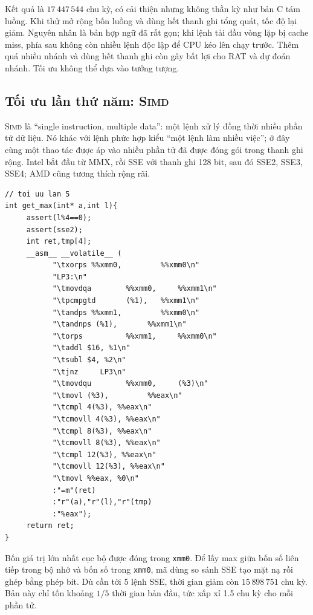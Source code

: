 \documentclass[11pt]{article}
\newcommand{\SIMD}{\textsc{Simd}}
\begin{document}
Kết quả là \(17\,447\,544\) chu kỳ, có cải thiện nhưng không thần kỳ như bản
C tám luồng. Khi thử mở rộng bốn luồng và dùng hết thanh ghi tổng quát, tốc độ
lại giảm. Nguyên nhân là bản hợp ngữ đã rất gọn; khi lệnh tải đầu vòng lặp bị
cache miss, phía sau không còn nhiều lệnh độc lập để CPU kéo lên chạy trước.
Thêm quá nhiều nhánh và dùng hết thanh ghi còn gây bất lợi cho RAT và dự đoán
nhánh. Tối ưu không thể dựa vào tưởng tượng.

\subsection{Tối ưu lần thứ năm: \SIMD}

\SIMD{} là ``single instruction, multiple data'': một lệnh xử lý đồng thời
nhiều phần tử dữ liệu. Nó khác với lệnh phức hợp kiểu ``một lệnh làm nhiều
việc''; ở đây cùng một thao tác được áp vào nhiều phần tử đã được đóng gói
trong thanh ghi rộng. Intel bắt đầu từ MMX, rồi SSE với thanh ghi 128 bit, sau
đó SSE2, SSE3, SSE4; AMD cũng tương thích rộng rãi.

\begin{verbatim}
// toi uu lan 5
int get_max(int* a,int l){
     assert(l%4==0);
     assert(sse2);
     int ret,tmp[4];
     __asm__ __volatile__ (
           "\txorps %%xmm0,         %%xmm0\n"
           "LP3:\n"
           "\tmovdqa        %%xmm0,     %%xmm1\n"
           "\tpcmpgtd       (%1),   %%xmm1\n"
           "\tandps %%xmm1,         %%xmm0\n"
           "\tandnps (%1),       %%xmm1\n"
           "\torps          %%xmm1,     %%xmm0\n"
           "\taddl $16, %1\n"
           "\tsubl $4, %2\n"
           "\tjnz     LP3\n"
           "\tmovdqu        %%xmm0,     (%3)\n"
           "\tmovl (%3),         %%eax\n"
           "\tcmpl 4(%3), %%eax\n"
           "\tcmovll 4(%3), %%eax\n"
           "\tcmpl 8(%3), %%eax\n"
           "\tcmovll 8(%3), %%eax\n"
           "\tcmpl 12(%3), %%eax\n"
           "\tcmovll 12(%3), %%eax\n"
           "\tmovl %%eax, %0\n"
           :"=m"(ret)
           :"r"(a),"r"(l),"r"(tmp)
           :"%eax");
     return ret;
}
\end{verbatim}

Bốn giá trị lớn nhất cục bộ được đóng trong \texttt{xmm0}. Để lấy max giữa
bốn số liên tiếp trong bộ nhớ và bốn số trong \texttt{xmm0}, mã dùng so sánh
SSE tạo mặt nạ rồi ghép bằng phép bit. Dù cần tới 5 lệnh SSE, thời gian giảm
còn \(15\,898\,751\) chu kỳ. Bản này chỉ tốn khoảng \(1/5\) thời gian bản đầu,
tức xấp xỉ 1.5 chu kỳ cho mỗi phần tử.
\end{document}
